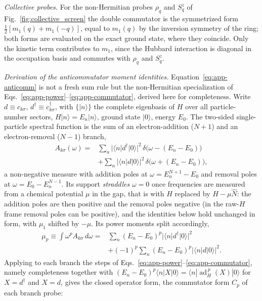 \documentclass[aps,prb,onecolumn,superscriptaddress,longbibliography,floatfix]{revtex4-2}
\begin{document}
\emph{Collective probes.} For the non-Hermitian probes $\rho_q$ and $S^z_q$ of Fig.~\ref{fig:collective_screen} the double commutator is the symmetrized form $\tfrac12[m_1(q)+m_1(-q)]$, equal to $m_1(q)$ by the inversion symmetry of the ring; both forms are evaluated on the exact ground state, where they coincide. Only the kinetic term contributes to $m_1$, since the Hubbard interaction is diagonal in the occupation basis and commutes with $\rho_q$ and $S^z_q$.

\emph{Derivation of the anticommutator moment identities.} Equation~\eqref{eq:app-anticomm} is not a fresh sum rule but the non-Hermitian specialization of Eqs.~\eqref{eq:app-power}--\eqref{eq:app-commutator}, derived here for completeness. Write $d\equiv c_{k\sigma}$, $d^\dagger\equiv c_{k\sigma}^\dagger$, with $\{|n\rangle\}$ the complete eigenbasis of $H$ over all particle-number sectors, $H|n\rangle=E_n|n\rangle$, ground state $|0\rangle$, energy $E_0$. The two-sided single-particle spectral function is the sum of an electron-addition ($N{+}1$) and an electron-removal ($N{-}1$) branch,
\begin{equation}
\begin{split}
A_{k\sigma}(\omega)={}&\sum_n|\langle n|d^\dagger|0\rangle|^2\,\delta\!\big(\omega-(E_n-E_0)\big)\\
&+\sum_n|\langle n|d|0\rangle|^2\,\delta\!\big(\omega+(E_n-E_0)\big),
\end{split}
\label{eq:app-twosided}
\end{equation}
a non-negative measure with addition poles at $\omega=E^{N+1}_n-E_0$ and removal poles at $\omega=E_0-E^{N-1}_n$. Its support \emph{straddles} $\omega=0$ once frequencies are measured from a chemical potential $\mu$ in the gap, that is with $H$ replaced by $H-\mu\hat N$: the addition poles are then positive and the removal poles negative (in the raw-$H$ frame removal poles can be positive), and the identities below hold unchanged in form, with $\mu_1$ shifted by $-\mu$. Its power moments split accordingly,
\begin{equation}
\begin{split}
\mu_p\equiv\int\omega^p A_{k\sigma}\,d\omega={}&\sum_n(E_n-E_0)^p|\langle n|d^\dagger|0\rangle|^2\\
&+(-1)^p\sum_n(E_n-E_0)^p|\langle n|d|0\rangle|^2 .
\end{split}
\end{equation}
Applying to each branch the steps of Eqs.~\eqref{eq:app-power}--\eqref{eq:app-commutator}, namely completeness together with ${(E_n-E_0)^p\langle n|X|0\rangle}$\allowbreak${{}=\langle n|\operatorname{ad}_H^{\,p}(X)|0\rangle}$ for $X=d^\dagger$ and $X=d$, gives the closed operator form, the commutator form $C_p$ of each branch probe:
\end{document}
